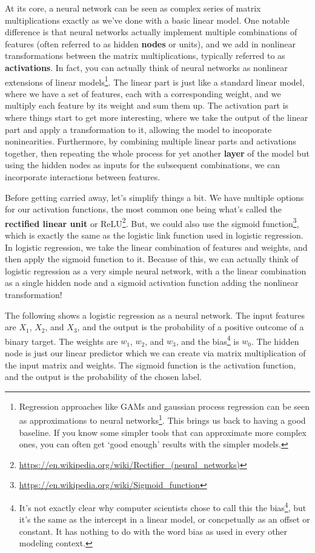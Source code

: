 \documentclass[
  letterpaper,
]{krantz}
\DeclareRobustCommand{\href}[2]{#2\footnote{\url{#1}}}
\begin{document}
At its core, a neural network can be seen as complex series of matrix
multiplications exactly as we've done with a basic linear model. One
notable difference is that neural networks actually implement multiple
combinations of features (often referred to as hidden \textbf{nodes} or
units), and we add in nonlinear transformations between the matrix
multiplications, typically referred to as \textbf{activations}. In fact,
you can actually think of neural networks as nonlinear extensions of
linear models\footnote{Regression approaches like GAMs and gaussian
  process regression can be seen as
  \href{https://arxiv.org/abs/1711.00165}{approximations to neural
  networks}. This brings us back to having a good baseline. If you know
  some simpler tools that can approximate more complex ones, you can
  often get `good enough' results with the simpler models.}. The linear
part is just like a standard linear model, where we have a set of
features, each with a corresponding weight, and we multiply each feature
by its weight and sum them up. The activation part is where things start
to get more interesting, where we take the output of the linear part and
apply a transformation to it, allowing the model to incoporate
noninearities. Furthermore, by combining multiple linear parts and
activations together, then repeating the whole process for yet another
\textbf{layer} of the model but using the hidden nodes as inputs for the
subsequent combinations, we can incorporate interactions between
features.

Before getting carried away, let's simplify things a bit. We have
multiple options for our activation functions, the most common one being
what's called the \textbf{rectified linear unit} or
\href{https://en.wikipedia.org/wiki/Rectifier_(neural_networks)}{ReLU}.
But, we could also use the
\href{https://en.wikipedia.org/wiki/Sigmoid_function}{sigmoid function},
which is exactly the same as the logistic link function used in logistic
regression. In logistic regression, we take the linear combination of
features and weights, and then apply the sigmoid function to it. Because
of this, we can actually think of logistic regression as a very simple
neural network, with a the linear combination as a single hidden node
and a sigmoid activation function adding the nonlinear transformation!

The following shows a logistic regression as a neural network. The input
features are \(X_1\), \(X_2\), and \(X_3\), and the output is the
probability of a positive outcome of a binary target. The weights are
\(w_1\), \(w_2\), and \(w_3\), and the bias\footnote{It's not exactly
  clear
  \href{https://stats.stackexchange.com/questions/511726/different-usage-of-the-term-bias-in-stats-machine-learning}{why
  computer scientists chose to call this the bias}, but it's the same as
  the intercept in a linear model, or concpetually as an offset or
  constant. It has nothing to do with the word bias as used in every
  other modeling context.} is \(w_0\). The hidden node is just our
linear predictor which we can create via matrix multiplication of the
input matrix and weights. The sigmoid function is the activation
function, and the output is the probability of the chosen label.
\end{document}
